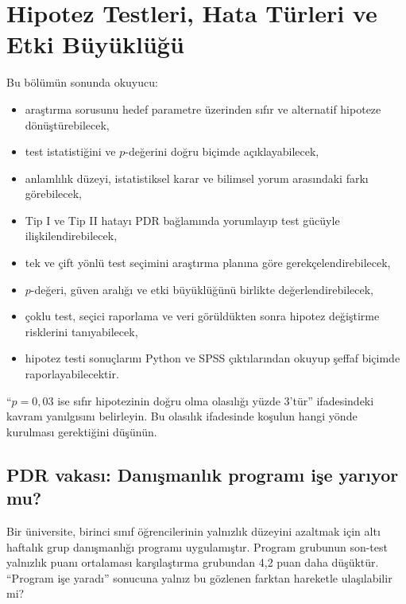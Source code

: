 \chapter{Hipotez Testleri, Hata Türleri ve Etki Büyüklüğü}
\label{ch:hypothesis}

\begin{hedefler}
Bu bölümün sonunda okuyucu:
\begin{itemize}
  \item araştırma sorusunu hedef parametre üzerinden sıfır ve alternatif hipoteze dönüştürebilecek,
  \item test istatistiğini ve $p$-değerini doğru biçimde açıklayabilecek,
  \item anlamlılık düzeyi, istatistiksel karar ve bilimsel yorum arasındaki farkı görebilecek,
  \item Tip I ve Tip II hatayı PDR bağlamında yorumlayıp test gücüyle ilişkilendirebilecek,
  \item tek ve çift yönlü test seçimini araştırma planına göre gerekçelendirebilecek,
  \item $p$-değeri, güven aralığı ve etki büyüklüğünü birlikte değerlendirebilecek,
  \item çoklu test, seçici raporlama ve veri görüldükten sonra hipotez değiştirme risklerini tanıyabilecek,
  \item hipotez testi sonuçlarını Python ve SPSS çıktılarından okuyup şeffaf biçimde raporlayabilecektir.
\end{itemize}
\end{hedefler}

\begin{hazirlik}
``$p=0{,}03$ ise sıfır hipotezinin doğru olma olasılığı yüzde 3'tür''
ifadesindeki kavram yanılgısını belirleyin. Bu olasılık ifadesinde koşulun
hangi yönde kurulması gerektiğini düşünün.
\end{hazirlik}

\section{PDR vakası: Danışmanlık programı işe yarıyor mu?}

Bir üniversite, birinci sınıf öğrencilerinin yalnızlık düzeyini azaltmak için
altı haftalık grup danışmanlığı programı uygulamıştır. Program grubunun
son-test yalnızlık puanı ortalaması karşılaştırma grubundan 4,2 puan daha
düşüktür. ``Program işe yaradı'' sonucuna yalnız bu gözlenen farktan hareketle
ulaşılabilir mi?

